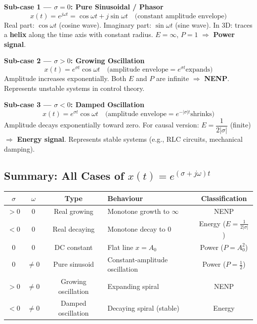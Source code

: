 \documentclass[10pt,a4paper]{article}
\begin{document}
\begin{propbox}
\textbf{Sub-case 1 --- $\sigma = 0$: Pure Sinusoidal / Phasor}
\[
  x(t) = e^{j\omega t} = \cos\omega t + j\sin\omega t \quad\text{(constant amplitude envelope)}
\]
Real part: $\cos\omega t$ (cosine wave). Imaginary part: $\sin\omega t$ (sine wave).
In 3D: traces a \textbf{helix} along the time axis with constant radius.
$E=\infty$, $P=1$ $\Rightarrow$ \textbf{Power signal}.

\medskip
\textbf{Sub-case 2 --- $\sigma > 0$: Growing Oscillation}
\[
  x(t) = e^{\sigma t}\cos\omega t \quad\text{(amplitude envelope} = e^{\sigma t} \text{expands)}
\]
Amplitude increases exponentially. Both $E$ and $P$ are infinite $\Rightarrow$ \textbf{NENP}.
Represents unstable systems in control theory.

\medskip
\textbf{Sub-case 3 --- $\sigma < 0$: Damped Oscillation}
\[
  x(t) = e^{\sigma t}\cos\omega t \quad\text{(amplitude envelope} = e^{-|\sigma|t} \text{shrinks)}
\]
Amplitude decays exponentially toward zero. For causal version: $E=\dfrac{1}{2|\sigma|}$ (finite)
$\Rightarrow$ \textbf{Energy signal}. Represents stable systems (e.g., RLC circuits, mechanical damping).
\end{propbox}

\subsection*{Summary: All Cases of $x(t) = e^{(\sigma+j\omega)t}$}

\begin{center}
{\small
\begin{tabular}{@{}ccc p{4.5cm} c@{}}
\toprule
$\sigma$ & $\omega$ & Type & Behaviour & Classification \\
\midrule
$>0$ & $0$ & Real growing & Monotone growth to $\infty$ & NENP \\
$<0$ & $0$ & Real decaying & Monotone decay to $0$ & Energy ($E=\tfrac{1}{2|\sigma|}$) \\
$0$ & $0$ & DC constant & Flat line $x=A_0$ & Power ($P=A_0^2$) \\
$0$ & $\neq0$ & Pure sinusoid & Constant-amplitude oscillation & Power ($P=\tfrac{1}{2}$) \\
$>0$ & $\neq0$ & Growing oscillation & Expanding spiral & NENP \\
$<0$ & $\neq0$ & Damped oscillation & Decaying spiral (stable) & Energy \\
\bottomrule
\end{tabular}
}
\end{center}
\end{document}
